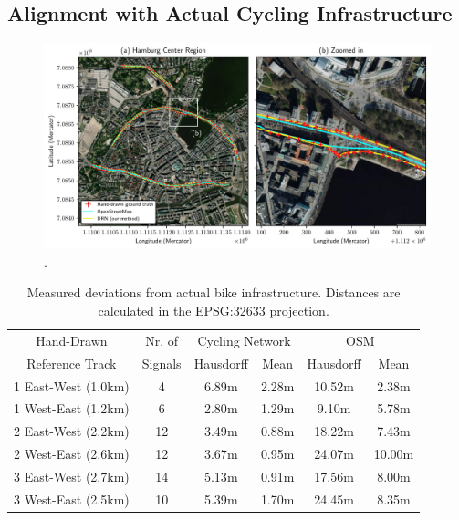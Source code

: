 \subsection{Alignment with Actual Cycling Infrastructure}

\begin{figure}[htbp]
\centering 
\includegraphics[width=\linewidth]{images/routing-hand-drawn-ground-truth.pdf}
\caption{.}
\label{fig:}
\end{figure}

\begin{table}[htbp]
\centering
\begin{tabular}{cccccc}
\hline
Hand-Drawn & Nr. of &\multicolumn{2}{c}{Cycling Network} & \multicolumn{2}{c}{OSM} \\
Reference Track & Signals & Hausdorff & Mean & Hausdorff & Mean \\ \hline
1 East-West ({1.0}{km}) & 4 & {6.89}{m} & {2.28}{m} & {10.52}{m} & {2.38}{m} \\
1 West-East ({1.2}{km}) & 6 &{2.80}{m} & {1.29}{m} & {9.10}{m} & {5.78}{m} \\
2 East-West ({2.2}{km}) & 12 & {3.49}{m} & {0.88}{m} & {18.22}{m} & {7.43}{m} \\
2 West-East ({2.6}{km}) & 12 & {3.67}{m} & {0.95}{m} & {24.07}{m}  & {10.00}{m} \\
3 East-West ({2.7}{km}) & 14 & {5.13}{m} & {0.91}{m} & {17.56}{m} & {8.00}{m} \\
3 West-East ({2.5}{km}) & 10 & {5.39}{m} & {1.70}{m} & {24.45}{m} & {8.35}{m} \\ \hline
\end{tabular}
\caption{Measured deviations from actual bike infrastructure. Distances are calculated in the EPSG:32633 projection.}%
\label{tab:accuracy-comparison}%
\end{table}

